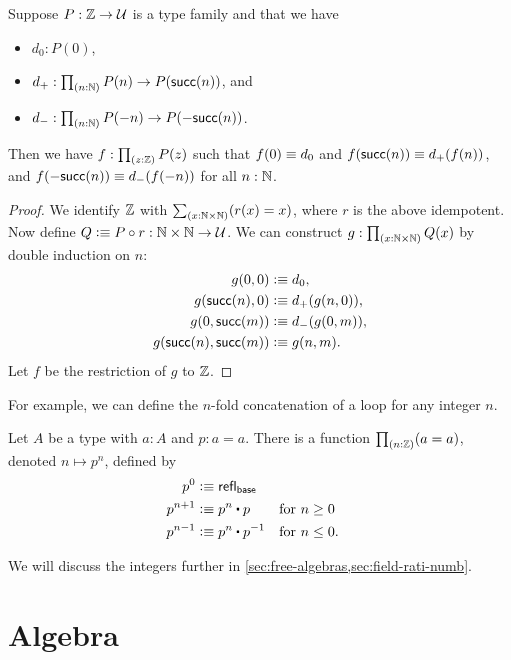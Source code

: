 \begin{lem}\label{thm:sign-induction}
  Suppose $P:\mathbb{Z}\to\mathcal{U}$ is a type family and that we have
  \begin{itemize}
  \item $d_0: P(0)$,
  \item $d_+: \prd{n:\N} P(n) \to P(\suc(n))$, and
  \item $d_- : \prd{n:\N} P(-n) \to P(-\suc(n))$.
  \end{itemize}
  Then we have $f:\prd{z:\Z} P(z)$ such that $f(0)\equiv d_0$ and $f(\mathsf{succ}(n))\equiv d_+(f(n))$, and $f(-\mathsf{succ}(n))\equiv d_-(f(-n))$ for all $n:\mathbb{N}$.
\end{lem}
\begin{proof}
  We identify $\mathbb{Z}$ with $\sm{x:\N\times\N}(r(x)=x)$, where $r$ is the above idempotent.
  Now define $Q\vcentcolon\equiv P\circ r:\mathbb{N}\times \mathbb{N} \to \mathcal{U}$.
  We can construct $g:\prd{x:\N\times \N} Q(x)$ by double induction on $n$:
  \begin{align*}
    g(0,0) &\vcentcolon\equiv d_0,\\
    g(\mathsf{succ}(n),0) &\vcentcolon\equiv d_+(g(n,0)),\\
    g(0,\mathsf{succ}(m)) &\vcentcolon\equiv d_-(g(0,m)),\\
    g(\mathsf{succ}(n),\mathsf{succ}(m)) &\vcentcolon\equiv g(n,m).
  \end{align*}
  Let $f$ be the restriction of $g$ to $\mathbb{Z}$.
\end{proof}

For example, we can define the $n$-fold concatenation of a loop for any integer $n$.

\begin{cor}\label{thm:looptothe}
  Let $A$ be a type with $a:A$ and $p:a=a$.
  There is a function $\prd{n:\Z} (a=a)$, denoted $n\mapsto p^n$, defined by
  \begin{align*}
    p^0 &\defeq \refl{\base}\\
    p^{n+1} &\defeq p^n \ct p
    & &\text{for $n\ge 0$}\\
    p^{n-1} &\defeq p^n \ct \opp p
    & &\text{for $n\le 0$.}
  \end{align*}
\end{cor}

We will discuss the integers further in \autoref{sec:free-algebras,sec:field-rati-numb}.

%

\section{Algebra}
\label{sec:free-algebras}

